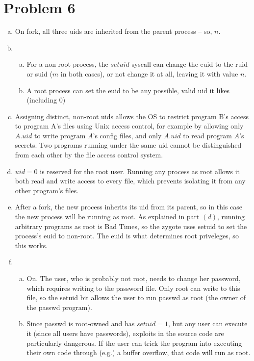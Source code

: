 \documentclass{article}
\begin{document}
\newpage
\section*{Problem 6}

\begin{enumerate}[a.]
\item On fork, all three uids are inherited from the parent process -- so, $n$.
\item 
  \begin{enumerate}[a.]
  \item For a non-root process, the $setuid$ syscall can change the euid to the ruid or suid ($m$ in both cases), or not change it at all, leaving it with value $n$.
  \item A root process can set the euid to be any possible, valid uid it likes (including $0$)
  \end{enumerate}
\item Assigning distinct, non-root uids allows the OS to restrict program B's access to program A's files using Unix access control, for example by allowing only $A.uid$ to write program $A$'s config files, and only $A.uid$ to read program $A$'s secrets. Two programs running under the same uid cannot be distinguished from each other by the file access control system.
\item $uid = 0$ is reserved for the root user. Running any process as root allows it both read and write access to every file, which prevents isolating it from any other program's files.
\item After a fork, the new process inherits its uid from its parent, so in this case the new process will be running as root. As explained in part $(d)$, running arbitrary programs as root is Bad Times, so the zygote uses setuid to set the process's euid to non-root. The euid is what determines root priveleges, so this works.
\item
  \begin{enumerate}[a.]
  \item On. The user, who is probably not root, needs to change her password, which requires writing to the password file. Only root can write to this file, so the setuid bit allows the user to run passwd as root (the owner of the passwd program).
  \item Since passwd is root-owned and has $setuid=1$, but any user can execute it (since all users have passwords), exploits in the source code are particularly dangerous. If the user can trick the program into executing their own code through (e.g.) a buffer overflow, that code will run as root.
  \end{enumerate}
\end{enumerate}
\end{document}
